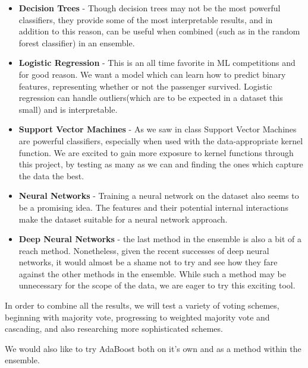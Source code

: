 \documentclass{article}
\begin{document}
\begin{itemize}
\item \textbf{Decision Trees} - Though decision trees may not be the most powerful classifiers, they provide some of the most interpretable results, and in addition to this reason, can be useful when combined (such as in the random forest classifier) in an ensemble. 

\item \textbf{Logistic Regression} - This is an all time favorite in ML competitions and for good reason. We want a model which can learn how to predict binary features, representing whether or not the passenger survived. Logistic regression can handle outliers(which are to be expected in a dataset this small) and is interpretable. 

\item \textbf{Support Vector Machines} - As we saw in class Support Vector Machines\cite{Burges} are powerful classifiers, especially when used with the data-appropriate kernel function. We are excited to gain more exposure to kernel functions through this project, by testing as many as we can and finding the ones which capture the data the best. 

\item \textbf{Neural Networks} - Training a neural network on the dataset also seems to be a promising idea. The features and their potential internal interactions make the dataset suitable for a neural network approach. 

\item \textbf{Deep Neural Networks} - the last method in the ensemble is also a bit of a reach method. Nonetheless, given the recent successes of deep neural networks, it would almost be a shame not to try and see how they fare against the other methods in the ensemble. While such a method may be unnecessary for the scope of the data, we are eager to try this exciting tool. 


\end{itemize}

In order to combine all the results, we will test a variety of voting schemes, beginning with majority vote, progressing to weighted majority vote and cascading, and also researching more sophisticated schemes\cite{battiti}. 

We would also like to try AdaBoost both on it's own and as a method within the ensemble. 



\end{document}
